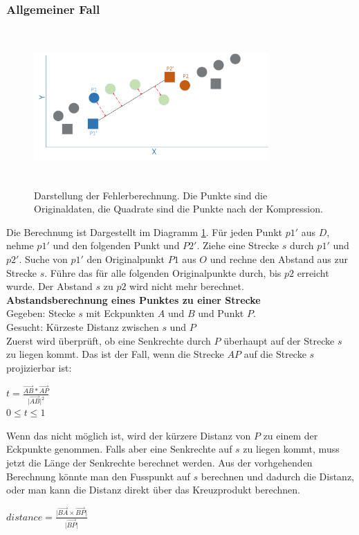\subsubsection{Allgemeiner Fall}
\begin{figure}[!htbp]
	\center
	\includegraphics[width=0.8\textwidth,height=6cm,keepaspectratio]{./pictures/testsetup/errorcalc.png}
	\caption{Darstellung der Fehlerberechnung. Die Punkte sind die Originaldaten, die Quadrate sind die Punkte nach der Kompression.}
	\label{testsetup:ablauf:fehlerberechnung:diagramm}
\end{figure} 
Die Berechnung ist Dargestellt im Diagramm \ref{testsetup:ablauf:fehlerberechnung:diagramm}. Für jeden Punkt $p1'$ aus $D$, nehme $p1'$ und den folgenden Punkt und $P2'$. Ziehe eine Strecke $s$ durch $p1'$ und $p2'$. Suche von $p1'$ den Originalpunkt $P1$ aus $O$ und rechne den Abstand aus zur Strecke $s$. Führe das für alle folgenden Originalpunkte durch, bis $p2$ erreicht wurde. Der Abstand $s$ zu $p2$ wird nicht mehr berechnet.\\
[\baselineskip]
\textbf{Abstandsberechnung eines Punktes zu einer Strecke}\\
Gegeben: Stecke $s$ mit Eckpunkten $A$ und $B$ und Punkt $P$.\\
Gesucht: Kürzeste Distanz zwischen $s$ und $P$\\
[\baselineskip]
Zuerst wird überprüft, ob eine Senkrechte durch $P$ überhaupt auf der Strecke $s$ zu liegen kommt. Das ist der Fall, wenn die Strecke $AP$ auf die Strecke $s$ projizierbar ist:
\begin{center}
$ t = \frac{\vec{AB}*\vec{AP}}{\lvert \vec{AB}\rvert ^2}$\\
  $0 \leq t \leq 1$
\end{center}
Wenn das nicht möglich ist, wird der kürzere Distanz von $P$ zu einem der Eckpunkte genommen. Falls aber eine Senkrechte auf $s$ zu liegen kommt, muss jetzt die Länge der Senkrechte berechnet werden. Aus der vorhgehenden Berechnung könnte man den Fusspunkt auf $s$ berechnen und dadurch die Distanz, oder man kann die Distanz direkt über das Kreuzprodukt berechnen.
\begin{center}
  $distance = \frac{\lvert \vec{BA}\times \vec{BP}\rvert}{\lvert \vec{BP} \rvert}$
\end{center}

